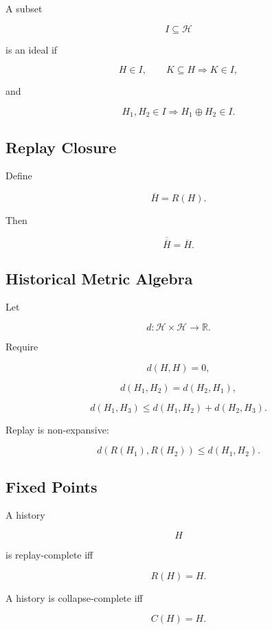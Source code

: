 \documentclass[12pt,oneside]{article}
\theoremstyle{definition}
\theoremstyle{remark}
\begin{document}
A subset

\[
I
\subseteq
\mathcal H
\]

is an ideal if

\[
H\in I,
\qquad
K\subseteq H
\Longrightarrow
K\in I,
\]

and

\[
H_1,H_2\in I
\Longrightarrow
H_1\oplus H_2
\in I.
\]

\subsection*{Replay Closure}

Define

\[
\overline H
=
R(H).
\]

Then

\[
\overline{\overline H}
=
\overline H.
\]

\subsection*{Historical Metric Algebra}

Let

\[
d
:
\mathcal H\times\mathcal H
\rightarrow
\mathbb R.
\]

Require

\[
d(H,H)=0,
\]

\[
d(H_1,H_2)=d(H_2,H_1),
\]

\[
d(H_1,H_3)
\le
d(H_1,H_2)
+
d(H_2,H_3).
\]

Replay is non-expansive:

\[
d(R(H_1),R(H_2))
\le
d(H_1,H_2).
\]

\subsection*{Fixed Points}

A history

\[
H
\]

is replay-complete iff

\[
R(H)=H.
\]

A history is collapse-complete iff

\[
C(H)=H.
\]
\end{document}
